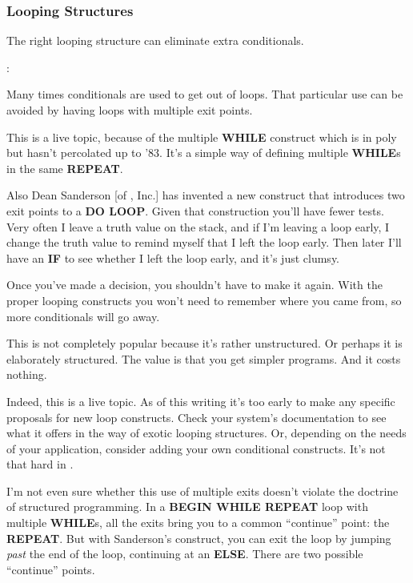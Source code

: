 \subsubsection{Looping Structures}
The right looping structure can eliminate extra conditionals.
\begin{interview}
:
\begin{tfquot}
Many times conditionals are used to get out of loops. That particular use
can be avoided by having loops with multiple exit points.

This is a live topic, because of the multiple \textbf{WHILE} construct which is in
poly\Forth{} but hasn't percolated up to \Forth{} '83. It's a simple way of
defining multiple \textbf{WHILE}s in the same \textbf{REPEAT}.

Also Dean Sanderson [of \Forth{}, Inc.] has invented a new construct that
introduces two exit points to a \textbf{DO LOOP}. Given that construction you'll
have fewer tests. Very often I leave a truth value on the stack, and if I'm
leaving a loop early, I change the truth value to remind myself that I left
the loop early. Then later I'll have an \textbf{IF} to see whether I left the
loop early, and it's just clumsy.

Once you've made a decision, you shouldn't have to make it again. With the
proper looping constructs you won't need to remember where you came
from, so more conditionals will go away.

This is not completely popular because it's rather unstructured. Or perhaps
it is elaborately structured. The value is that you get simpler programs.
And it costs nothing.
\end{tfquot}
\end{interview}
Indeed, this is a live topic. As of this writing it's too early to make any
specific proposals for new loop constructs. Check your system's
documentation to see what it offers in the way of exotic looping structures.
Or, depending on the needs of your application, consider adding
your own conditional constructs. It's not that hard in \Forth{}.

I'm not even sure whether this use of multiple exits doesn't violate
the doctrine of structured programming. In a \textbf{BEGIN WHILE REPEAT}
loop with multiple \textbf{WHILE}s, all the exits bring you to a common
``continue'' point: the \textbf{REPEAT}. But with Sanderson's construct, you
can exit the loop by jumping \emph{past} the end of the loop, continuing
at an \textbf{ELSE}. There are two possible ``continue'' points.

